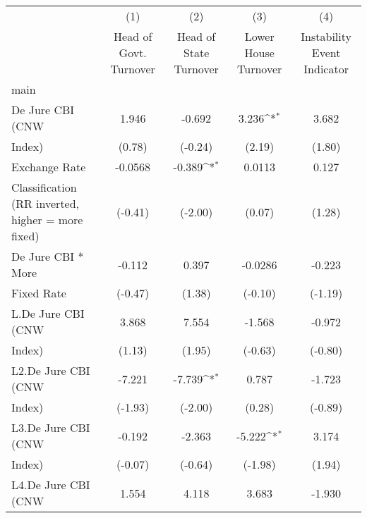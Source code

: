 {
\def\sym#1{\ifmmode^{#1}\else\(^{#1}\)\fi}
\begin{tabular}{l*{4}{c}}
\hline\hline
                    &\multicolumn{1}{c}{(1)}&\multicolumn{1}{c}{(2)}&\multicolumn{1}{c}{(3)}&\multicolumn{1}{c}{(4)}\\
                    &\multicolumn{1}{c}{Head of Govt. Turnover}&\multicolumn{1}{c}{Head of State Turnover}&\multicolumn{1}{c}{Lower House Turnover}&\multicolumn{1}{c}{Instability Event Indicator}\\
\hline
main                &                     &                     &                     &                     \\
De Jure CBI (CNW    &       1.946         &      -0.692         &       3.236\sym{*}  &       3.682         \\
Index)              &      (0.78)         &     (-0.24)         &      (2.19)         &      (1.80)         \\
[1em]
Exchange Rate       &     -0.0568         &      -0.389\sym{*}  &      0.0113         &       0.127         \\
Classification (RR inverted, higher = more fixed)&     (-0.41)         &     (-2.00)         &      (0.07)         &      (1.28)         \\
[1em]
De Jure CBI * More  &      -0.112         &       0.397         &     -0.0286         &      -0.223         \\
Fixed Rate          &     (-0.47)         &      (1.38)         &     (-0.10)         &     (-1.19)         \\
[1em]
L.De Jure CBI (CNW  &       3.868         &       7.554         &      -1.568         &      -0.972         \\
Index)              &      (1.13)         &      (1.95)         &     (-0.63)         &     (-0.80)         \\
[1em]
L2.De Jure CBI (CNW &      -7.221         &      -7.739\sym{*}  &       0.787         &      -1.723         \\
Index)              &     (-1.93)         &     (-2.00)         &      (0.28)         &     (-0.89)         \\
[1em]
L3.De Jure CBI (CNW &      -0.192         &      -2.363         &      -5.222\sym{*}  &       3.174         \\
Index)              &     (-0.07)         &     (-0.64)         &     (-1.98)         &      (1.94)         \\
[1em]
L4.De Jure CBI (CNW &       1.554         &       4.118         &       3.683         &      -1.930         \\

\end{tabular}}
